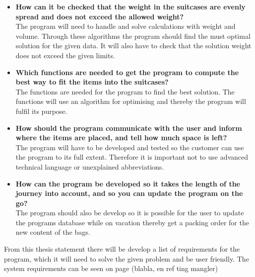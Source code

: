 \begin{itemize}
\item \textbf{How can it be checked that the weight in the suitcases are evenly spread and does not exceed the allowed weight?}\\

The program will need to handle and solve calculations with weight and volume. Through these algorithms the program should find the must optimal solution for the given data. It will also have to check that the solution weight does not exceed the given limits.

\item \textbf{Which functions are needed to get the program to compute the best way to fit the items into the suitcases?}\\

The functions are needed for the program to find the best solution. The functions will use an algorithm for optimising and thereby the program will fulfil its purpose.

\item \textbf{How should the program communicate with the user and inform where the items are placed, and tell how much space is left?}\\

The program will have to be developed and tested so the customer can use the program to its full extent. Therefore it is important not to use advanced technical language or unexplained abbreviations.

\item \textbf{How can the program be developed so it takes the length of the journey  into account, and so you can update the program on the go?}\\

The program should also be develop so it is possible for the user to update the programs database while on vacation thereby get a packing order for the new content of the bags.
\end{itemize}

From this thesis statement there will be develop a list of requirements for the program, which it will need to solve the given problem and be user friendly. The system requirements can be seen on page (blabla, en ref ting mangler)
